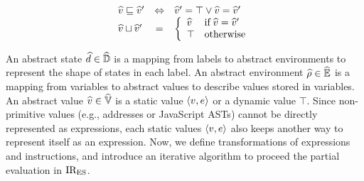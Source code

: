 \begin{itemize}
\[\begin{array}{lcl}
        \widehat{v} \sqsubseteq \widehat{v}' &\Leftrightarrow&
        \widehat{v}' = \top \vee \widehat{v} = \widehat{v}'\\

        \widehat{v} \sqcup \widehat{v}' &=& \left\{
          \begin{array}{ll}
            \widehat{v} & \text{if} \; \widehat{v} = \widehat{v}'\\
            \top & \text{otherwise}\\
          \end{array}
        \right.\\
      \end{array}
    \]
\end{itemize}
An abstract state $\widehat{d} \in \widehat{\mathbb{D}}$ is a mapping from labels to abstract
environments to represent the shape of states in each label. An abstract
environment $\widehat{\rho} \in \widehat{\mathbb{E}}$ is a mapping from variables to abstract values
to describe values stored in variables.  An abstract value $\widehat{v} \in \widehat{\mathbb{V}}$
is a static value $\langle v, e \rangle$ or a dynamic value $\top$.
Since non-primitive values (e.g., addresses or JavaScript ASTs) cannot be
directly represented as expressions, each static values $\langle v, e
\rangle$ also keeps another way to represent itself as an expression. Now, we
define transformations of expressions and instructions, and introduce an
iterative algorithm to proceed the partial evaluation in $\text{IR}_\text{ES}$.

